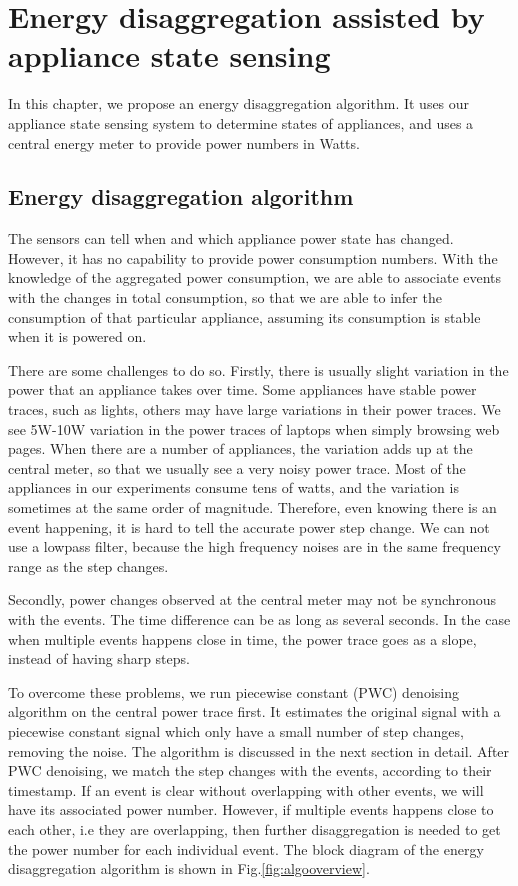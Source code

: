 \chapter{Energy disaggregation assisted by appliance state sensing}\label{chap5}

In this chapter, we propose an energy disaggregation algorithm. It uses our appliance state sensing system to determine states of appliances, and uses a central energy meter to provide power numbers in Watts. 

\section{Energy disaggregation algorithm}

The sensors can tell when and which appliance power state has changed. However, it has no capability to provide power consumption numbers. With the knowledge of the aggregated power consumption, we are able to associate events with the changes in total consumption, so that we are able to infer the consumption of that particular appliance, assuming its consumption is stable when it is powered on. 

There are some challenges to do so. Firstly, there is usually slight variation in the power that an appliance takes over time. Some appliances have stable power traces, such as lights, others may have large variations in their power traces. We see 5W-10W variation in the power traces of laptops when simply browsing web pages. When there are a number of appliances, the variation adds up at the central meter, so that we usually see a very noisy power trace. Most of the appliances in our experiments consume tens of watts, and the variation is sometimes at the same order of magnitude. Therefore, even knowing there is an event happening, it is hard to tell the accurate power step change. We can not use a lowpass filter, because the high frequency noises are in the same frequency range as the step changes. 

Secondly, power changes observed at the central meter may not be synchronous with the events. The time difference can be as long as several seconds. In the case when multiple events happens close in time, the power trace goes as a slope, instead of having sharp steps. 

To overcome these problems, we run piecewise constant (PWC) denoising algorithm on the central power trace first. It estimates the original signal with a piecewise constant signal which only have a small number of step changes, removing the noise. The algorithm is discussed in the next section in detail. After PWC denoising, we match the step changes with the events, according to their timestamp. If an event is clear without overlapping with other events, we will have its associated power number. However, if multiple events happens close to each other, i.e they are overlapping, then further disaggregation is needed to get the power number for each individual event. The block diagram of the energy disaggregation algorithm is shown in Fig.\ref{fig:algooverview}. 

